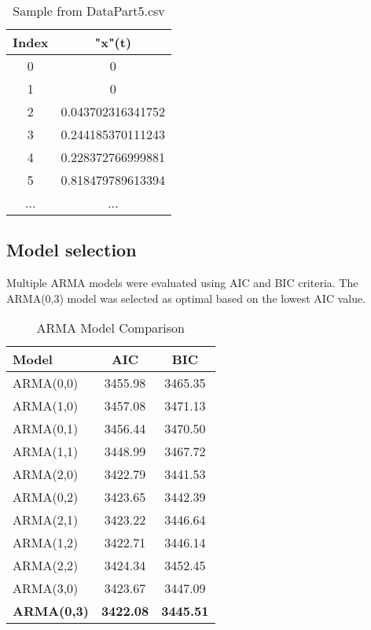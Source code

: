 \documentclass{article}
\begin{document}
\begin{table}[H]
\centering
\begin{tabular}{@{}cc}
    \toprule
    Index & "x"(t) \\
    \midrule
    0 & 0 \\
    1 & 0 \\
    2 & 0.043702316341752 \\
    3 & 0.244185370111243 \\
    4 & 0.228372766999881 \\
    5 & 0.818479789613394 \\
    ... & ... \\
    \bottomrule
\end{tabular}
\caption{Sample from DataPart5.csv}
\label{tab:data_sample}
\end{table}

\subsection{Model selection}

Multiple ARMA models were evaluated using AIC and BIC criteria. The ARMA(0,3) model was selected as optimal based on the lowest AIC value.

\begin{table}[H]
\centering
\begin{tabular}{@{}lcc@{}}
    \toprule
    Model & AIC & BIC \\
    \midrule
    ARMA(0,0) & 3455.98 & 3465.35 \\
    ARMA(1,0) & 3457.08 & 3471.13 \\
    ARMA(0,1) & 3456.44 & 3470.50 \\
    ARMA(1,1) & 3448.99 & 3467.72 \\
    ARMA(2,0) & 3422.79 & 3441.53 \\
    ARMA(0,2) & 3423.65 & 3442.39 \\
    ARMA(2,1) & 3423.22 & 3446.64 \\
    ARMA(1,2) & 3422.71 & 3446.14 \\
    ARMA(2,2) & 3424.34 & 3452.45 \\
    ARMA(3,0) & 3423.67 & 3447.09 \\
    \textbf{ARMA(0,3)} & \textbf{3422.08} & \textbf{3445.51} \\
    \bottomrule
\end{tabular}
\caption{ARMA Model Comparison}
\label{tab:arma_comparison}
\end{table}
\end{document}
